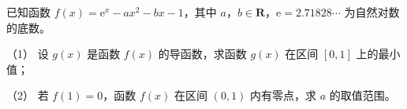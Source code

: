 \begin{question}
已知函数 $f(x)=\mathrm e^x-ax^2-bx-1$，其中 $a$，$b\in\mathbf R$，$\mathrm e=2.71828\cdots$ 为自然对数的底数。

（1） 设 $g(x)$ 是函数 $f(x)$ 的导函数，求函数 $g(x)$ 在区间 $[0,1]$ 上的最小值；

（2） 若 $f(1)=0$，函数 $f(x)$ 在区间 $(0,1)$ 内有零点，求 $a$ 的取值范围。

\end{question}